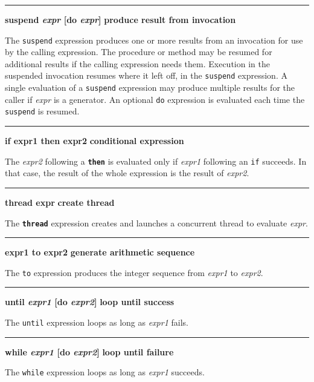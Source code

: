 \bigskip\hrule\vspace{0.1cm}
\noindent
{\bf \textbf{suspend} \textit{expr} [do \textit{expr}] } \hfill {\bf produce result from invocation}

\noindent
{}The \texttt{suspend} expression produces one or more
results from an invocation for use by the calling expression. The
procedure or method may be resumed for additional results if the
calling expression needs them. Execution in the suspended invocation
resumes where it left off, in the \texttt{suspend} expression. A single
evaluation of a \texttt{suspend} expression may produce multiple
results for the caller if \textit{expr} is a
generator. An optional \texttt{do} expression is
evaluated each time the \texttt{suspend} is resumed.

\bigskip\hrule\vspace{0.1cm}
\noindent
{\bf if expr1 then expr2 } \hfill {\bf conditional expression}

\noindent
{}The \textit{expr2} following a \texttt{\bf then} is evaluated
only if \textit{expr1} following an \texttt{if} succeeds. In that case,
the result of the whole expression is the result of \textit{expr2}.


\bigskip\hrule\vspace{0.1cm}
\noindent
{\bf thread expr } \hfill {\bf create thread}

\noindent
{}The \texttt{\bf thread} expression creates and launches
a concurrent thread to evaluate \textit{expr}.

\bigskip\hrule\vspace{0.1cm}
\noindent
{\bf expr1 to expr2 } \hfill {\bf generate arithmetic sequence}

\noindent
{}The \texttt{to} expression produces the integer
sequence from \textit{expr1} to \textit{expr2}.

\bigskip\hrule\vspace{0.1cm}
\noindent
{\bf \textbf{until} \textit{expr1} [do \textit{expr2}] } \hfill {\bf loop until success}

\noindent
{}The \texttt{until} expression loops as long
as \textit{expr1} fails.

\bigskip\hrule\vspace{0.1cm}
\noindent
{\bf \textbf{while} \textit{expr1} [do \textit{expr2}] } \hfill {\bf loop until failure}

\noindent
{}The \texttt{while} expression loops as long as
\textit{expr1} succeeds.

